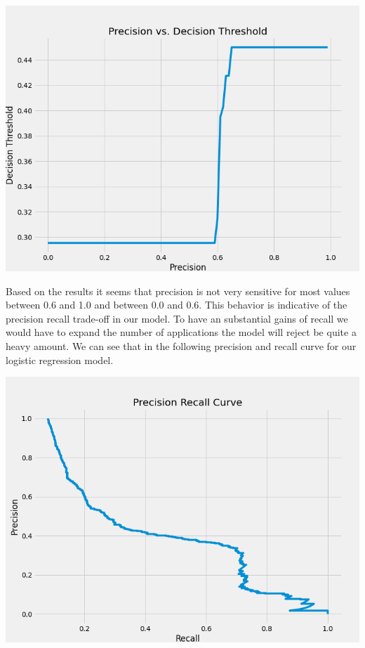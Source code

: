 \documentclass[12pt]{article}
\begin{document}
	\begin{center}
		\includegraphics[scale = 0.4]{../notebooks/precisionvsthreshold.png}
	\end{center}
	
	Based on the results it seems that precision is not very sensitive for most values between 0.6 and 1.0 and between 0.0 and 0.6. This behavior is indicative of the precision recall trade-off in our model. To have an substantial gains of recall we would have to expand the number of applications the model will reject be quite a heavy amount. We can see that in the following precision and recall curve for our logistic regression model. 
	
	\begin{center}
		\includegraphics[scale=0.4]{../notebooks/pr_curve_lr.png}
	\end{center}
\end{document}
